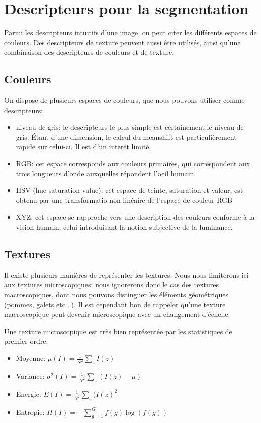 \documentclass{article}
\begin{document}
\section{Descripteurs pour la segmentation}

Parmi les descripteurs intuitifs d'une image, on peut citer les différents
espaces de couleurs. Des descripteurs de texture peuvent aussi être utilisés,
ainsi qu'une combinaison des descripteurs de couleurs et de texture.

\subsection{Couleurs}

On dispose de plusieurs espaces de couleurs, que nous pouvons utiliser comme
descripteurs:

\begin{itemize}
\item niveau de gris: le descripteurs le plus simple est certainement le
niveau de gris. Étant d'une dimension, le calcul du meanshift est
particulièrement rapide sur celui-ci. Il est d'un interêt limité.
\item RGB: cet espace corresponds aux couleurs primaires, qui correspondent
aux trois longueurs d'onde auxquelles répondent l'oeil humain.
\item HSV (hue saturation value): cet espace de teinte, saturation et valeur,
est obtenu par une transformatio non linéaire de l'espace de couleur RGB
\item XYZ: cet espace se rapproche vers une description des couleurs conforme
à la vision humain, celui introduisant la notion subjective de la luminance.
\end{itemize}

\subsection{Textures}

Il existe plusieurs manières de représenter les textures. Nous nous limiterons
ici aux textures microscopiques: nous ignorerons donc le cas des textures
macroscopiques, dont nous pouvons distinguer les éléments géométriques
(pommes, galets etc...). Il est cependant bon de rappeler qu'une texture
macroscopique peut devenir microscopique avec un changement d'échelle.

Une texture microscopique est très bien représentée par les statistiques de
premier ordre:
\begin{itemize}
\item Moyenne: $\mu(I) = \frac{1}{N^2} \sum_z I(z)$
\item Variance: $\sigma^2(I) = \frac{1}{N^2} \sum_z (I(z) - \mu)$
\item Energie: $E(I) = \frac{1}{N^2} \sum_z (I(z)^2$
\item Entropie: $H(I) = - \sum_{g = 1}^G f(g) \log(f(g))$
\end{itemize}
\end{document}
